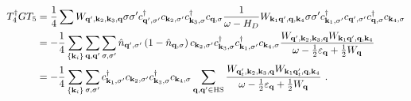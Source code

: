 \documentclass{revtex4-2}
\begin{document}
\begin{equation}\begin{aligned}
	T_4^\dagger G T_5 &= \frac{1}{4}\sum W_{{\bf q}^\prime, {\bf k}_2, {\bf k}_3, {\bf q}} \sigma\sigma^\prime c^\dagger_{{\bf q}^\prime,\sigma^\prime}c_{{\bf k}_2,\sigma^\prime}c^\dagger_{{\bf k}_3,\sigma}c_{{\bf q},\sigma} \frac{1}{\omega - H_D} W_{{\bf k}_1 {\bf q}^\prime, {\bf q}, {\bf k}_4} \sigma\sigma^\prime c^\dagger_{{\bf k}_1,\sigma^\prime}c_{{\bf q}^\prime,\sigma^\prime}c^\dagger_{{\bf q},\sigma}c_{{\bf k}_4,\sigma}\\
		  &= -\frac{1}{4}\sum_{\left\{ {\bf k}_i \right\} }\sum_{{\bf q},{\bf q}^\prime}\sum_{\sigma,\sigma^\prime} \hat n_{{\bf q}^\prime,\sigma^\prime} \left(1 - \hat n_{{\bf q},\sigma}\right) c_{{\bf k}_2,\sigma^\prime} c^\dagger_{{\bf k}_3,\sigma} c^\dagger_{{\bf k}_1,\sigma^\prime}c_{{\bf k}_4,\sigma}  \frac{W_{{\bf q}^\prime, {\bf k}_2, {\bf k}_3, {\bf q}} W_{{\bf k}_1 {\bf q}^\prime, {\bf q}, {\bf k}_4}}{\omega - \frac{1}{2}\varepsilon_{{\bf q}}  + \frac{1}{2}W_{{\bf q}}}  \\
		  &= -\frac{1}{4}\sum_{\left\{ {\bf k}_i \right\}}\sum_{\sigma,\sigma^\prime} c^\dagger_{{\bf k}_1,\sigma^\prime}c_{{\bf k}_2,\sigma^\prime}c^\dagger_{{\bf k}_3,\sigma} c_{{\bf k}_4,\sigma} \sum_{{\bf q}, {\bf q}^\prime \in \text{HS}}\frac{W_{{\bf q}_t^\prime, {\bf k}_2, {\bf k}_3, {\bf q}} W_{{\bf k}_1 {\bf q}_t^\prime, {\bf q}, {\bf k}_4}}{\omega - \frac{1}{2}\varepsilon_{{\bf q}}  + \frac{1}{2}W_{{\bf q}}}~.
\end{aligned}\end{equation}
\end{document}

